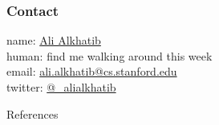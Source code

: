 \documentclass{beamer}
\begin{document}
\begin{frame}
  \frametitle{Contact}
    name: \href{https://ali-alkhatib.com}{Ali Alkhatib} \\
    human: find me walking around this week \\
    email: \href{mailto:ali.alkhatib@cs.stanford.edu}{ali.alkhatib@cs.stanford.edu} \\
    twitter: \href{https://twitter.com/_alialkhatib}{@\_alialkhatib} \\
\end{frame}


\begin{frame}[allowframebreaks]{References}
  
  
\end{frame}
\end{document}
